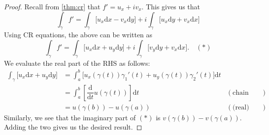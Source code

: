 \fundcalc*\label{thm:fundcalc2}
\begin{flushright}\hyperref[thm:fundcalc]{\upsym}\end{flushright}
\begin{proof}
	Recall from \cref{thm:cr} that $f' = u_x + iv_x.$ This gives us that
	\begin{equation*} 
		\int_\gamma f' = \int_\gamma\big[u_x\mathrm{d}x - v_x\mathrm{d}y\big] + i \int_\gamma\big[u_x\mathrm{d}y + v_x\mathrm{d}x\big]
	\end{equation*}
	Using CR equations, the above can be written as
	\begin{equation*} 
		\int_\gamma f' = \int_\gamma\big[u_x\mathrm{d}x + u_y\mathrm{d}y\big] + i \int_\gamma\big[v_y\mathrm{d}y + v_x\mathrm{d}x\big]. \quad (*)
	\end{equation*}
	We evaluate the real part of the RHS as follows:
	\begin{align*} 
		\int_\gamma\big[u_x\mathrm{d}x + u_y\mathrm{d}y\big] &= \int_{a}^{b} \big[u_x(\gamma(t))\gamma_1'(t) + u_y(\gamma(t))\gamma_2'(t)\big] \mathrm{d}t\\
		&= \int_{a}^{b} \left[\dfrac{\mathrm{d}}{\mathrm{d}t}u(\gamma(t))\right] \mathrm{d}t & (\text{chain rule})\\
		&= u(\gamma(b)) - u(\gamma(a)) & (\text{(real) FTC})
	\end{align*}
	Similarly, we see that the imaginary part of $(*)$ is $v(\gamma(b)) - v(\gamma(a)).$ Adding the two gives us the desired result.
\end{proof}


